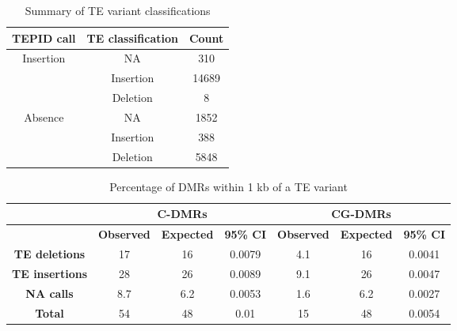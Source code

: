 \documentclass[12pt]{article}
\begin{document}
\vspace*{1 cm}

\begin{table}[h]
  \centering
  \caption{Summary of TE variant classifications}
  \label{table2}
  \begin{tabular}{@{}ccc@{}}
    \toprule
    \textbf{TEPID call}        & \textbf{TE classification} & \textbf{Count} \\ \midrule
    \multirow{3}{*}{Insertion} & NA                         & 310            \\
    & Insertion                  & 14689          \\
    & Deletion                  & 8              \\ \midrule
    \multirow{3}{*}{Absence}   & NA                         & 1852           \\
    & Insertion                  & 388            \\
    & Deletion                   & 5848  \\ \bottomrule
  \end{tabular}
\end{table}

\vspace*{1 cm}

\begin{table}[h]
  \centering
  \caption{Percentage of DMRs within 1 kb of a TE variant}
  \label{table3}
  \begin{tabular}{@{}cccc|ccc@{}}
    \toprule
    \textbf{}              & \multicolumn{3}{c|}{\textbf{C-DMRs}}                     & \multicolumn{3}{c}{\textbf{CG-DMRs}}                    \\ \midrule
    \textbf{}              & \textbf{Observed} & \textbf{Expected} & \textbf{95\% CI} & \textbf{Observed} & \textbf{Expected} & \textbf{95\% CI} \\ \midrule
    \textbf{TE deletions}  & 17               & 16                & 0.0079           & 4.1               & 16                & 0.0041           \\
    \textbf{TE insertions} & 28                & 26                & 0.0089           & 9.1               & 26                & 0.0047           \\
    \textbf{NA calls}      & 8.7               & 6.2               & 0.0053           & 1.6               & 6.2               & 0.0027           \\
    \textbf{Total}         & 54                & 48                & 0.01             & 15                & 48                & 0.0054           \\ \bottomrule
  \end{tabular}
\end{table}
\end{document}
